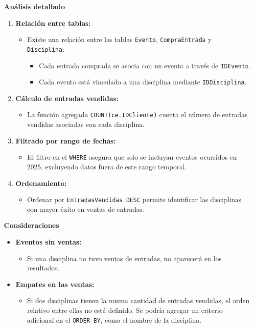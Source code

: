 \textbf{Análisis detallado}

\begin{enumerate}
   \item \textbf{Relación entre tablas:}
   \begin{itemize}
       \item Existe una relación entre las tablas \texttt{Evento}, \texttt{CompraEntrada} y \texttt{Disciplina}:
       \begin{itemize}
           \item Cada entrada comprada se asocia con un evento a través de \texttt{IDEvento}.
           \item Cada evento está vinculado a una disciplina mediante \texttt{IDDisciplina}.
       \end{itemize}
   \end{itemize}
   
   \item \textbf{Cálculo de entradas vendidas:}
   \begin{itemize}
       \item La función agregada \texttt{COUNT(ce.IDCliente)} cuenta el número de entradas vendidas asociadas con cada disciplina.
   \end{itemize}
   
   \item \textbf{Filtrado por rango de fechas:}
   \begin{itemize}
       \item El filtro en el \texttt{WHERE} asegura que solo se incluyan eventos ocurridos en 2025, excluyendo datos fuera de este rango temporal.
   \end{itemize}
   
   \item \textbf{Ordenamiento:}
   \begin{itemize}
       \item Ordenar por \texttt{EntradasVendidas DESC} permite identificar las disciplinas con mayor éxito en ventas de entradas.
   \end{itemize}
\end{enumerate}

\textbf{Consideraciones}

\begin{itemize}
   \item \textbf{Eventos sin ventas:}
   \begin{itemize}
       \item Si una disciplina no tuvo ventas de entradas, no aparecerá en los resultados.
   \end{itemize}
   \item \textbf{Empates en las ventas:}
   \begin{itemize}
       \item Si dos disciplinas tienen la misma cantidad de entradas vendidas, el orden relativo entre ellas no está definido. Se podría agregar un criterio adicional en el \texttt{ORDER BY}, como el nombre de la disciplina.
   \end{itemize}
\end{itemize}


